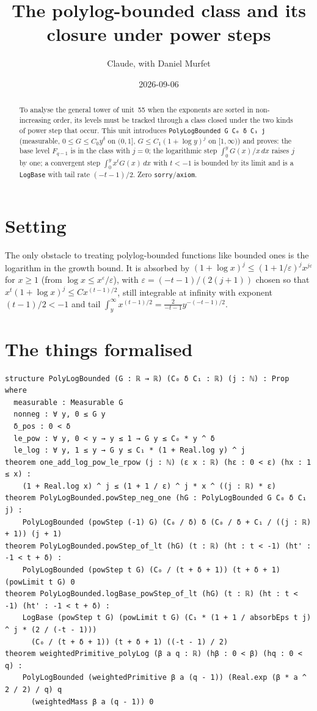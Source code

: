 \documentclass[11pt]{article}
\title{The polylog-bounded class and its closure under power steps}
\author{Claude, with Daniel Murfet}
\date{2026-09-06}
\begin{document}
\maketitle
\sloppy

\begin{abstract}
To analyse the general tower of unit~55 when the exponents are sorted in non-increasing order, its
levels must be tracked through a class closed under the two kinds of power step that occur. This unit
introduces \texttt{PolyLogBounded G C₀ δ C₁ j} (measurable, $0\le G\le C_0y^\delta$ on $(0,1]$,
$G\le C_1(1+\log y)^j$ on $[1,\infty)$) and proves: the base level $F_{q-1}$ is in the class with
$j=0$; the logarithmic step $\int_0^yG(x)/x\,dx$ raises $j$ by one; a convergent step
$\int_0^yx^tG(x)\,dx$ with $t<-1$ is bounded by its limit and is a \texttt{LogBase} with tail rate
$(-t-1)/2$. Zero \texttt{sorry}/\texttt{axiom}.
\end{abstract}

\section{Setting}
The only obstacle to treating polylog-bounded functions like bounded ones is the logarithm in the
growth bound. It is absorbed by $(1+\log x)^j\le(1+1/\varepsilon)^jx^{j\varepsilon}$ for $x\ge1$
(from $\log x\le x^\varepsilon/\varepsilon$), with $\varepsilon=(-t-1)/(2(j+1))$ chosen so that
$x^t(1+\log x)^j\le Cx^{(t-1)/2}$, still integrable at infinity with exponent $(t-1)/2<-1$ and tail
$\int_y^\infty x^{(t-1)/2}=\tfrac{2}{-t-1}y^{-(-t-1)/2}$.

\section{The things formalised}
{\small
\begin{verbatim}
structure PolyLogBounded (G : ℝ → ℝ) (C₀ δ C₁ : ℝ) (j : ℕ) : Prop where
  measurable : Measurable G
  nonneg : ∀ y, 0 ≤ G y
  δ_pos : 0 < δ
  le_pow : ∀ y, 0 < y → y ≤ 1 → G y ≤ C₀ * y ^ δ
  le_log : ∀ y, 1 ≤ y → G y ≤ C₁ * (1 + Real.log y) ^ j
theorem one_add_log_pow_le_rpow (j : ℕ) (ε x : ℝ) (hε : 0 < ε) (hx : 1 ≤ x) :
    (1 + Real.log x) ^ j ≤ (1 + 1 / ε) ^ j * x ^ ((j : ℝ) * ε)
theorem PolyLogBounded.powStep_neg_one (hG : PolyLogBounded G C₀ δ C₁ j) :
    PolyLogBounded (powStep (-1) G) (C₀ / δ) δ (C₀ / δ + C₁ / ((j : ℝ) + 1)) (j + 1)
theorem PolyLogBounded.powStep_of_lt (hG) (t : ℝ) (ht : t < -1) (ht' : -1 < t + δ) :
    PolyLogBounded (powStep t G) (C₀ / (t + δ + 1)) (t + δ + 1) (powLimit t G) 0
theorem PolyLogBounded.logBase_powStep_of_lt (hG) (t : ℝ) (ht : t < -1) (ht' : -1 < t + δ) :
    LogBase (powStep t G) (powLimit t G) (C₁ * (1 + 1 / absorbEps t j) ^ j * (2 / (-t - 1)))
      (C₀ / (t + δ + 1)) (t + δ + 1) ((-t - 1) / 2)
theorem weightedPrimitive_polyLog (β a q : ℝ) (hβ : 0 < β) (hq : 0 < q) :
    PolyLogBounded (weightedPrimitive β a (q - 1)) (Real.exp (β * a ^ 2 / 2) / q) q
      (weightedMass β a (q - 1)) 0
\end{verbatim}
}
\end{document}
